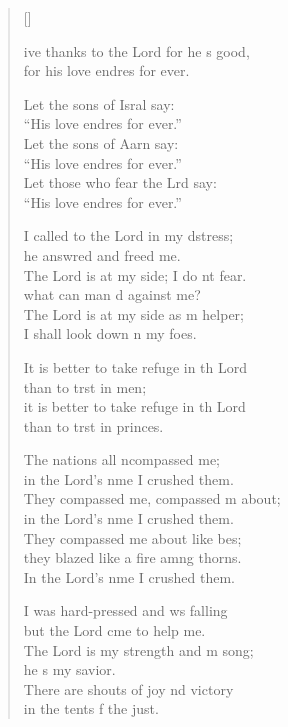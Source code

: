 \settowidth{\versewidth}{I shall not die, I shall live and recount his deeds.}
\begin{verse}[\versewidth]
  \begin{patverse}
    ive thanks to the Lord for he \pointup{\i}s good,\Med\\
    for his love endres for ever.

    Let the sons of Isral say:\Med\\
    “His love endres for ever.”\\
    Let the sons of Aarn say:\Med\\
    “His love endres for ever.”\\
    Let those who fear the Lrd say:\Med\\
    “His love endres for ever.”

    I called to the Lord in my d\pointup{\i}stress;\Med\\
    he answred and freed me.\\
    The Lord is at my side; I do nt fear.\Med\\
    what can man d against me?\\
    The Lord is at my side as m helper;\Med\\
    I shall look down n my foes.

    It is better to take refuge in th Lord\Med\\
    than to trst in men;\\
    it is better to take refuge in th Lord\Med\\
    than to trst in princes.

    The nations all ncompassed me;\Med\\
    in the Lord’s nme I crushed them.\\
    They compassed me, compassed m about;\Med\\
    in the Lord’s nme I crushed them.\\
    They compassed me about like bes;\Flex\\
    they blazed like a fire amng thorns.\Med\\
    In the Lord’s nme I crushed them.

    I was hard-pressed and ws falling\Med\\
    but the Lord cme to help me.\\
    The Lord is my strength and m song;\Med\\
    he \pointup{\i}s my savior.\\
    There are shouts of joy nd victory\Med\\
    in the tents f the just.


\end{patverse}
\end{verse}
